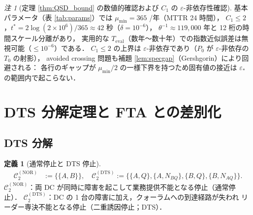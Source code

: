 \documentclass[12pt,a4paper]{article}
\theoremstyle{plain}
\theoremstyle{definition}
\newtheorem{definition}[theorem]{定義}
\theoremstyle{remark}
\newtheorem{remark}[theorem]{注}
\newcommand{\eps}{\varepsilon}
\newcommand{\Proj}{P}
\newcommand{\calCtwo}{\mathcal{C}_2}
\newcommand{\calCNOR}{\calCtwo^{(\mathrm{NOR})}}
\newcommand{\calCDTS}{\calCtwo^{(\mathrm{DTS})}}
\newcommand{\Teval}{T_{\mathrm{eval}}}
\begin{document}
\begin{remark}[定理 \ref{thm:QSD_bound} の数値的確認および $C_1$ の $\eps$-非依存性確認]
  基本パラメータ（表 \ref{tab:params}）では
  $\mu_{\min}=365$ /年（MTTR 24 時間），
  $C_1\le2$，$t^*=2\log(2\times10^6)/365\approx 42$ 秒（$\delta=10^{-6}$），
  $\theta^{-1}\approx 119{,}000$ 年と 12 桁の時間スケール分離があり，
  実用的な $\Teval$（数年〜数十年）での指数近似誤差は無視可能（$\le10^{-6}$）である．
  $C_1\le2$ の上界は $\eps$-非依存であり（$\Proj_0$ が $\eps$-非依存の $T_0$ の射影），
  avoided crossing 問題も補題 \ref{lem:specgap}（Gershgorin）により回避される：
  各行のギャップが $\mu_{\min}/2$ の一様下界を持つため固有値の接近は $\eps_*$ の範囲内で起こらない．
\end{remark}

\section{DTS 分解定理と FTA との差別化}\label{sec:DTS}

\subsection{DTS 分解}

\begin{definition}[通常停止と DTS 停止]\label{def:DTS}
  \begin{align}
    \calCNOR &:= \bigl\{\{A,B\}\bigr\},\quad
    \calCDTS := \bigl\{\{A,Q\},\{A,N_{BQ}\},\{B,Q\},\{B,N_{AQ}\}\bigr\}.
  \end{align}
  $\calCNOR$：両 DC が同時に障害を起こして業務提供不能となる停止（通常停止）．
  $\calCDTS$：DC の 1 台の障害に加え，クォーラムへの到達経路が失われ
  リーダー専決不能となる停止（二重誘因停止；DTS）．
\end{definition}
\end{document}
